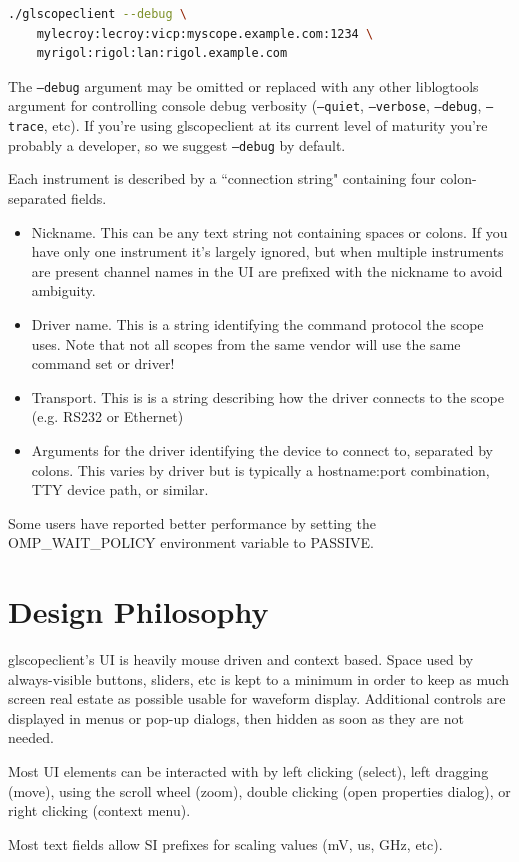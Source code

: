 \begin{lstlisting}[language=sh]
./glscopeclient --debug \
	mylecroy:lecroy:vicp:myscope.example.com:1234 \
	myrigol:rigol:lan:rigol.example.com
\end{lstlisting}

The \texttt{--debug} argument may be omitted or replaced with any other liblogtools argument for controlling console
debug verbosity (\texttt{--quiet}, \texttt{--verbose}, \texttt{--debug}, \texttt{--trace}, etc). If you're using
glscopeclient at its current level of maturity you're probably a developer, so we suggest \texttt{--debug} by default.

Each instrument is described by a ``connection string" containing four colon-separated fields.

\begin{itemize}
\item Nickname. This can be any text string not containing spaces or colons. If you have only one instrument it's
largely ignored, but when multiple instruments are present channel names in the UI are prefixed with the nickname to
avoid ambiguity.
\item Driver name. This is a string identifying the command protocol the scope uses. Note that not all
scopes from the same vendor will use the same command set or driver!
\item Transport. This is is a string describing how the driver connects to the scope (e.g. RS232 or Ethernet)
\item Arguments for the driver identifying the device to connect to, separated by colons. This varies by driver but is
typically a hostname:port combination, TTY device path, or similar.
\end{itemize}

Some users have reported better performance by setting the OMP\_WAIT\_POLICY environment variable to PASSIVE.

\section{Design Philosophy}

glscopeclient's UI is heavily mouse driven and context based. Space used by always-visible buttons, sliders, etc is
kept to a minimum in order to keep as much screen real estate as possible usable for waveform display. Additional
controls are displayed in menus or pop-up dialogs, then hidden as soon as they are not needed.

Most UI elements can be interacted with by left clicking (select), left dragging (move), using the scroll wheel (zoom),
double clicking (open properties dialog), or right clicking (context menu).

Most text fields allow SI prefixes for scaling values (mV, us, GHz, etc).
